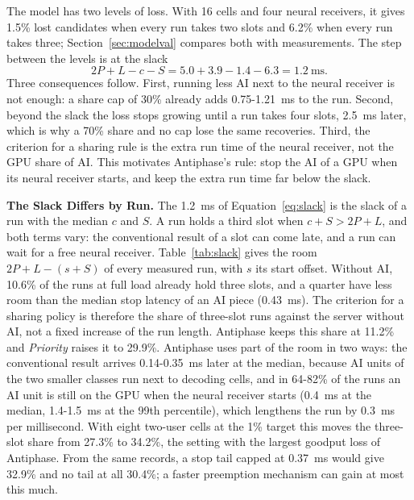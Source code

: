 \documentclass[acmsmall,screen,review,anonymous]{acmart}
\newcommand{\sys}{Antiphase\xspace}
\begin{document}
The model has two levels of loss. With 16 cells and four neural receivers, it gives 1.5\% lost candidates
when every run takes two slots and 6.2\% when every run takes three; Section~\ref{sec:modelval} compares
both with measurements. The step between the levels is at the slack
\begin{equation}
2P + L - c - S = 5.0 + 3.9 - 1.4 - 6.3 = 1.2~\text{ms}.
\label{eq:slack}
\end{equation}
Three consequences follow. First, running less AI next to the neural receiver is not enough: a share cap
of 30\% already adds 0.75-1.21~ms to the run. Second, beyond the slack the loss stops growing until a run
takes four slots, 2.5~ms later, which is why a 70\% share and no cap lose the same recoveries. Third, the
criterion for a sharing rule is the extra run time of the neural receiver, not the GPU share of AI. This
motivates \sys's rule: stop the AI of a GPU when its neural receiver starts, and keep the extra run time
far below the slack.

\noindent\textbf{The Slack Differs by Run.} The 1.2~ms of Equation~\ref{eq:slack} is the slack of a run with
the median $c$ and $S$. A run holds a third slot when $c + S > 2P + L$, and both terms vary: the
conventional result of a slot can come late, and a run can wait for a free neural receiver.
Table~\ref{tab:slack} gives the room $2P + L - (s + S)$ of every measured run, with $s$ its start offset.
Without AI, 10.6\% of the runs at full load already hold three slots, and a quarter have less room than the
median stop latency of an AI piece (0.43~ms). The criterion for a sharing policy is therefore the share of
three-slot runs against the server without AI, not a fixed increase of the run length. \sys keeps this share
at 11.2\% and \textit{Priority} raises it to 29.9\%. \sys uses part of the room in two ways: the conventional
result arrives 0.14-0.35~ms later at the median, because AI units of the two smaller classes run next to
decoding cells, and in 64-82\% of the runs an AI unit is still on the GPU when the neural receiver starts
(0.4~ms at the median, 1.4-1.5~ms at the 99th percentile), which lengthens the run by 0.3~ms per millisecond.
With eight two-user cells at the 1\% target this moves the three-slot share from 27.3\% to 34.2\%, the
setting with the largest goodput loss of \sys. From the same records, a stop tail capped at 0.37~ms would
give 32.9\% and no tail at all 30.4\%; a faster preemption mechanism can gain at most this much.
\end{document}
